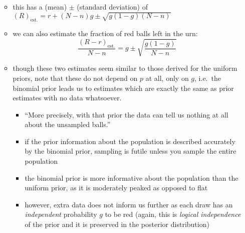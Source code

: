 \documentclass[../jaynes_prob_theory_notes.tex]{subfiles}
\begin{document}
\begin{itemize}
\begin{itemize}
\begin{equation}
                    \end{equation}
                \item this has a (mean) $\pm$ (standard deviation) of ${(R)}_{\mathrm{est.}} = r+ (N-n)g \pm \sqrt{g(1-g)(N-n)}$
                \item we can also estimate the fraction of red balls left in the urn:
                    \begin{equation*}
                        \frac{{(R-r)}_{\mathrm{est.}}}{N-n} = g \pm \sqrt{\frac{g(1-g)}{N-n}}
                    \end{equation*}
                \item though these two estimates seem similar to those derived for the uniform priors, note that these do not depend on $p$ at all, only on $g$, i.e.\ the binomial prior leads us to estimates which are exactly the same as prior estimates with no data whatsoever.
                    \begin{itemize}
                        \item ``More precisely, with that prior the data can tell us nothing at all about the unsampled balls.''
                        \item if the prior information about the population is described accurately by the binomial prior, sampling is futile unless you sample the entire population
                        \item the binomial prior is more informative about the population than the uniform prior, as it is moderately peaked as opposed to flat
                        \item however, extra data does not inform us further as each draw has an \textit{independent} probability $g$ to be red (again, this is \textit{logical independence} of the prior and it is preserved in the posterior distribution)
                    \end{itemize}
            \end{itemize}
    \end{itemize}
\end{document}
